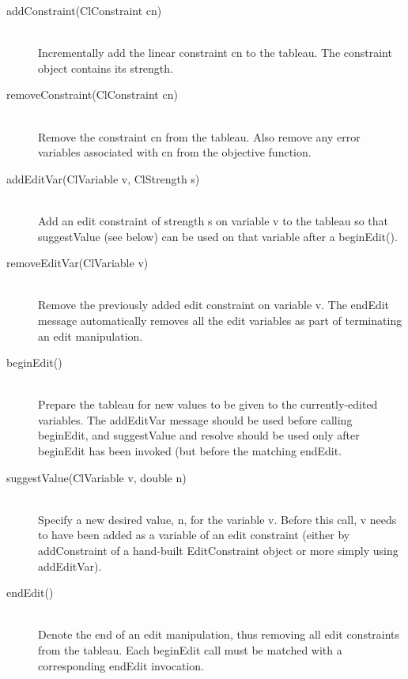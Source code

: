 \documentclass{article}
\begin{document}
\begin{description}

\item[{\sf addConstraint(ClConstraint cn)}] \ \\
Incrementally add the linear constraint {\sf cn} to the tableau.  The
constraint object contains its strength.

\item[{\sf removeConstraint(ClConstraint cn)}] \ \\
Remove the constraint {\sf cn} from the tableau.  Also remove 
any error variables associated with {\sf cn} from the objective function.


\item[{\sf addEditVar(ClVariable v, ClStrength s)}] \ \\
      Add an edit constraint of strength {\sf s} on variable {\sf v} to
      the tableau so that {\sf suggestValue} (see below) can be used on
      that variable after a {\sf beginEdit()}.
      

\item[{\sf removeEditVar(ClVariable v)}] \ \\
      Remove the previously added edit constraint on variable {\sf v}.
      The {\sf endEdit} message automatically removes all the edit
      variables as part of terminating an edit manipulation.
      

\item[{\sf beginEdit()}] \ \\
      Prepare the tableau for new values to be given to the
      currently-edited variables.  The {\sf addEditVar} message should
      be used before calling {\sf beginEdit}, and {\sf suggestValue} and
      {\sf resolve} should be used only after {\sf beginEdit} has been
      invoked (but before the matching {\sf endEdit}.
      

\item[{\sf suggestValue(ClVariable v, double n)}] \ \\
      Specify a new desired value, {\sf n}, for the variable {\sf v}.
      Before this call, {\sf v} needs to have been added as a variable
      of an edit constraint (either by {\sf addConstraint} of a
      hand-built {\sf EditConstraint} object or more simply using {\sf
        addEditVar}).
      

\item[{\sf endEdit()}] \ \\
      Denote the end of an edit manipulation, thus removing all edit
      constraints from the tableau.  Each {\sf beginEdit} call must be
      matched with a corresponding {\sf endEdit} invocation.


\end{description}
\end{document}
